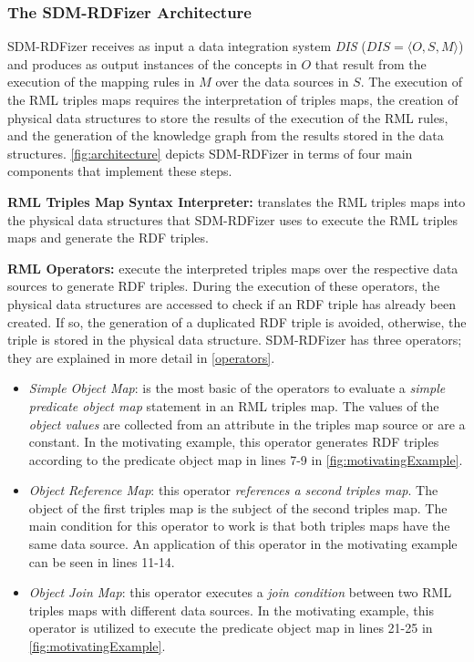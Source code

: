 \subsubsection{The SDM-RDFizer Architecture}
SDM-RDFizer receives as input a data integration system \textit{DIS} ($DIS=\langle O,S,M\rangle$) and produces as output instances of the concepts in $O$ that result from the execution of the mapping rules in $M$ over the data sources in $S$. 
The execution of the RML triples maps requires the interpretation of triples maps, the creation of physical data structures to store the results of the execution of the RML rules, and the generation of the knowledge graph from the results stored in the data structures. \autoref{fig:architecture} depicts SDM-RDFizer in terms of four main components that implement these steps. 

\noindent\textbf{RML Triples Map Syntax Interpreter:} translates the RML triples maps into the physical data structures that SDM-RDFizer uses to execute the RML triples maps and generate the RDF triples.

\noindent\textbf{RML Operators:} execute the interpreted triples maps over the respective data sources to generate RDF triples. 
During the execution of these operators, the physical data structures are accessed to check if an RDF triple has already been created.
If so, the generation of a duplicated RDF triple is avoided, otherwise, the triple is stored in the physical data structure.
SDM-RDFizer has three operators; they are explained in more detail in \autoref{operators}.
    \begin{itemize}
        \item \textit{Simple Object Map}: is the most basic of the operators to evaluate a \textit{simple predicate object map} statement in an RML triples map. The values of the \textit{object values} are collected from an attribute in the triples map source or are a constant. In the motivating example, this operator generates RDF triples according to the predicate object map in lines 7-9 in \autoref{fig:motivatingExample}.  
        \item \textit{Object Reference Map}: this operator \textit{references a second triples map}. The object of the first triples map is the subject of the second triples map. The main condition for this operator to work is that both triples maps have the same data source. An application of this operator in the motivating example can be seen in lines 11-14. 
        \item \textit{Object Join Map}: this operator executes a \textit{join condition} between two RML triples maps with different data sources. In the motivating example, this operator is utilized to execute the predicate object map in lines 21-25 in \autoref{fig:motivatingExample}.
    \end{itemize}
    
